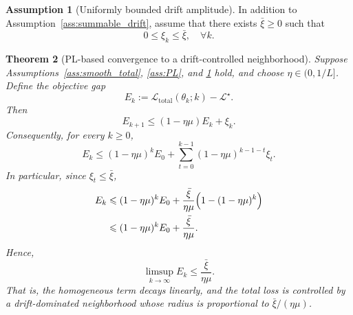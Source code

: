 \documentclass{article}
\theoremstyle{plain}
\newtheorem{theorem}{Theorem}[section]
\theoremstyle{definition}
\newtheorem{assumption}[theorem]{Assumption}
\theoremstyle{remark}
\begin{document}
\begin{assumption}[Uniformly bounded drift amplitude]
	\label{ass:bounded_drift}
	In addition to Assumption~\ref{ass:summable_drift}, assume that there
	exists $\bar\xi\geqslant 0$ such that
	\begin{equation}
		0\leqslant \xi_k\leqslant \bar\xi,
		\quad \forall k.
		\label{eq:app_xi_upper}
	\end{equation}
\end{assumption}

\begin{theorem}[PL-based convergence to a drift-controlled neighborhood]
	\label{thm:PL_neighborhood}
	Suppose Assumptions~\ref{ass:smooth_total}, \ref{ass:PL}, and
	\ref{ass:bounded_drift} hold, and choose $\eta\in(0,1/L]$.
	Define the objective gap
	\begin{equation}
		E_k
		:=
		\mathcal{L}_{\mathrm{total}}(\theta_k;k)-\mathcal{L}^{\star}.
		\label{eq:app_gap_def}
	\end{equation}
	Then
	\begin{equation}
		E_{k+1}
		\leqslant
		(1-\eta\mu)E_k+\xi_k.
		\label{eq:app_PL_recursion}
	\end{equation}
	Consequently, for every $k\geqslant 0$,
	\begin{equation}
		E_k
		\leqslant
		(1-\eta\mu)^kE_0
		+
		\sum_{t=0}^{k-1}(1-\eta\mu)^{k-1-t}\xi_t.
		\label{eq:app_PL_unrolled}
	\end{equation}
	In particular, since $\xi_t\leqslant \bar\xi$,
	\begin{equation}
		\begin{aligned}
			E_k
			\leqslant\;&
			(1-\eta\mu)^kE_0
			+
			\frac{\bar\xi}{\eta\mu}
			\Bigl(
			1-(1-\eta\mu)^k
			\Bigr) \\
			\leqslant\;&
			(1-\eta\mu)^kE_0+\frac{\bar\xi}{\eta\mu}.
		\end{aligned}
		\label{eq:app_PL_neighborhood}
	\end{equation}
	Hence,
	\begin{equation}
		\limsup_{k\to\infty}E_k
		\leqslant
		\frac{\bar\xi}{\eta\mu}.
		\label{eq:app_PL_limsup}
	\end{equation}
	That is, the homogeneous term decays linearly, and the total loss is
	controlled by a drift-dominated neighborhood whose radius is
	proportional to $\bar\xi/(\eta\mu)$.
\end{theorem}
\end{document}
